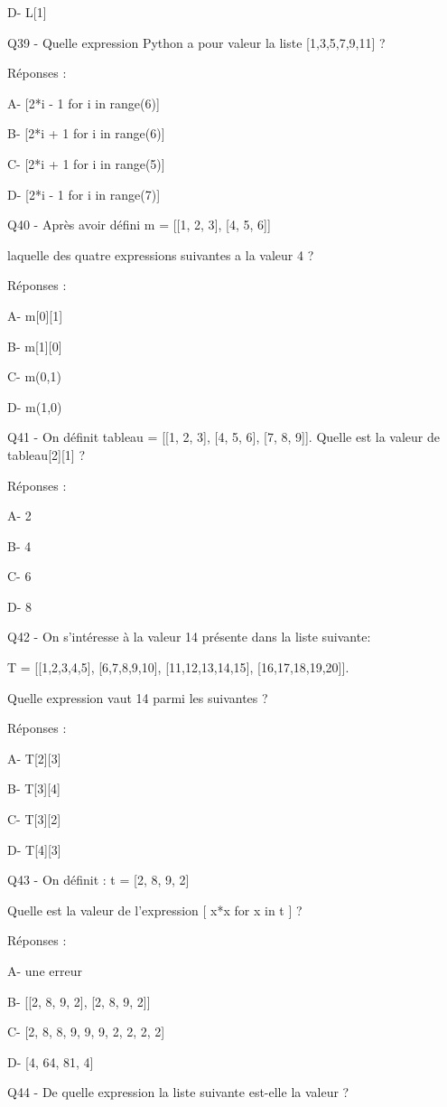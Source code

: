 \documentclass[
]{book}
\begin{document}
D- L{[}1{]}

Q39 - Quelle expression Python a pour valeur la liste {[}1,3,5,7,9,11{]} ?

Réponses :

A- {[}2*i - 1 for i in range(6){]}

B- {[}2*i + 1 for i in range(6){]}

C- {[}2*i + 1 for i in range(5){]}

D- {[}2*i - 1 for i in range(7){]}

Q40 - Après avoir défini m = {[}{[}1, 2, 3{]}, {[}4, 5, 6{]}{]}

laquelle des quatre expressions suivantes a la valeur 4 ?

Réponses :

A- m{[}0{]}{[}1{]}

B- m{[}1{]}{[}0{]}

C- m(0,1)

D- m(1,0)

Q41 - On définit tableau = {[}{[}1, 2, 3{]}, {[}4, 5, 6{]}, {[}7, 8, 9{]}{]}. Quelle est la valeur de tableau{[}2{]}{[}1{]} ?

Réponses :

A- 2

B- 4

C- 6

D- 8

Q42 - On s'intéresse à la valeur 14 présente dans la liste suivante:

T = {[}{[}1,2,3,4,5{]}, {[}6,7,8,9,10{]}, {[}11,12,13,14,15{]}, {[}16,17,18,19,20{]}{]}.

Quelle expression vaut 14 parmi les suivantes ?

Réponses :

A- T{[}2{]}{[}3{]}

B- T{[}3{]}{[}4{]}

C- T{[}3{]}{[}2{]}

D- T{[}4{]}{[}3{]}

Q43 - On définit : t = {[}2, 8, 9, 2{]}

Quelle est la valeur de l'expression {[} x*x for x in t {]} ?

Réponses :

A- une erreur

B- {[}{[}2, 8, 9, 2{]}, {[}2, 8, 9, 2{]}{]}

C- {[}2, 8, 8, 9, 9, 9, 2, 2, 2, 2{]}

D- {[}4, 64, 81, 4{]}

Q44 - De quelle expression la liste suivante est-elle la valeur ?
\end{document}
